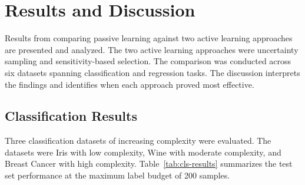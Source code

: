 \documentclass[conference]{IEEEtran}
\begin{document}
\section{Results and Discussion}

Results from comparing passive learning against two active learning approaches are presented and analyzed. The two active learning approaches were uncertainty sampling and sensitivity-based selection. The comparison was conducted across six datasets spanning classification and regression tasks. The discussion interprets the findings and identifies when each approach proved most effective.

\subsection{Classification Results}

Three classification datasets of increasing complexity were evaluated. The datasets were Iris with low complexity, Wine with moderate complexity, and Breast Cancer with high complexity. Table~\ref{tab:cls-results} summarizes the test set performance at the maximum label budget of 200 samples.
\end{document}
